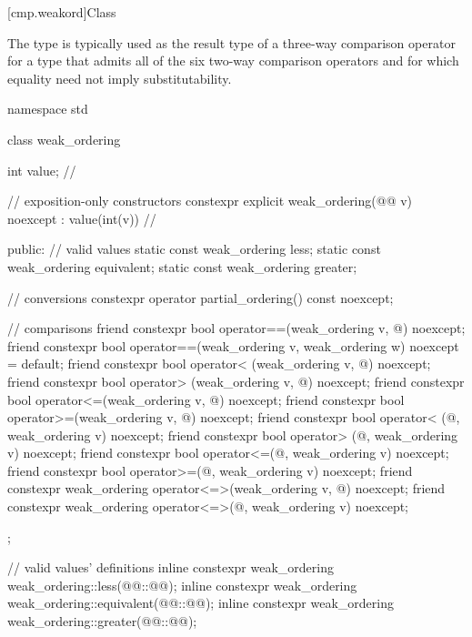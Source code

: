 [cmp.weakord]{Class }

\pnum
The  type is typically used
as the result type of a three-way comparison operator
for a type that admits
all of the six two-way comparison operators
and for which equality need not imply substitutability.

%
%
%
%
\begin{codeblock}
namespace std {
  class weak_ordering {
    int value;  // \expos

    // exposition-only constructors
    constexpr explicit weak_ordering(@@ v) noexcept : value(int(v)) {} // \expos

  public:
    // valid values
    static const weak_ordering less;
    static const weak_ordering equivalent;
    static const weak_ordering greater;

    // conversions
    constexpr operator partial_ordering() const noexcept;

    // comparisons
    friend constexpr bool operator==(weak_ordering v, @\unspec@) noexcept;
    friend constexpr bool operator==(weak_ordering v, weak_ordering w) noexcept = default;
    friend constexpr bool operator< (weak_ordering v, @\unspec@) noexcept;
    friend constexpr bool operator> (weak_ordering v, @\unspec@) noexcept;
    friend constexpr bool operator<=(weak_ordering v, @\unspec@) noexcept;
    friend constexpr bool operator>=(weak_ordering v, @\unspec@) noexcept;
    friend constexpr bool operator< (@\unspec@, weak_ordering v) noexcept;
    friend constexpr bool operator> (@\unspec@, weak_ordering v) noexcept;
    friend constexpr bool operator<=(@\unspec@, weak_ordering v) noexcept;
    friend constexpr bool operator>=(@\unspec@, weak_ordering v) noexcept;
    friend constexpr weak_ordering operator<=>(weak_ordering v, @\unspec@) noexcept;
    friend constexpr weak_ordering operator<=>(@\unspec@, weak_ordering v) noexcept;
  };

  // valid values' definitions
  inline constexpr weak_ordering weak_ordering::less(@@::@@);
  inline constexpr weak_ordering weak_ordering::equivalent(@@::@@);
  inline constexpr weak_ordering weak_ordering::greater(@@::@@);
}
\end{codeblock}

